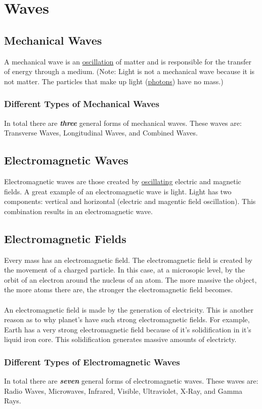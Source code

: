 \documentclass{article}
\begin{document}
\section{Waves}
\subsection{Mechanical Waves}
A mechanical wave is an \hyperref[sec:oscillation]{oscillation} of matter and is responsible for the transfer of energy through a medium. (Note: Light is not a mechanical wave because it is not matter. The particles that make up light (\hyperref[sec:photons]{photons}) have no mass.)
\subsubsection{Different Types of Mechanical Waves}
In total there are \textbf{\textit{three}} general forms of mechanical waves. These waves are: Transverse Waves, Longitudinal Waves, and Combined Waves.
\subsection{Electromagnetic Waves}
Electromagnetic waves are those created by \hyperref[sec:oscillation]{oscillating} electric and magnetic fields. A great example of an electromagnetic wave is light. Light has two components: vertical and horizontal (electric and magentic field oscillation). This combination results in an electromagnetic wave.
\subsection{Electromagnetic Fields}\label{sec:electromagneticfields}
Every mass has an electromagnetic field. The electromagnetic field is created by the movement of a charged particle. In this case, at a microsopic level, by the orbit of an electron around the nucleus of an atom. The more massive the object, the more atoms there are, the stronger the electromagnetic field becomes.\\\\
An electromagnetic field is made by the generation of electricity. This is another reason as to why planet's have such strong electromagnetic fields. For example, Earth has a very strong electromagnetic field because of it's solidification in it's liquid iron core. This solidification generates massive amounts of electricty.

\subsubsection{Different Types of Electromagnetic Waves}
In total there are \textbf{\textit{seven}} general forms of electromagnetic waves. These waves are: Radio Waves, Microwaves, Infrared, Visible, Ultraviolet, X-Ray, and Gamma Rays.
\end{document}
